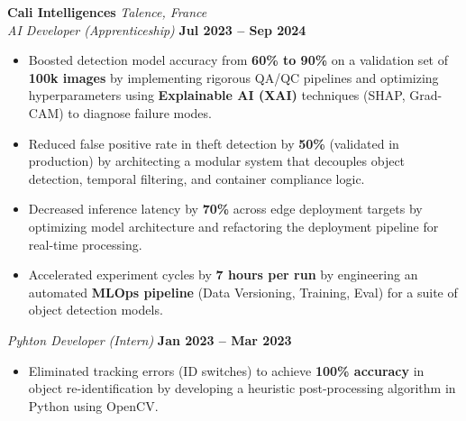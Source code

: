 \documentclass[10pt, letterpaper]{article}
\begin{document}
    \vspace{0.2cm}

    \textbf{Cali Intelligences} \hfill \textit{Talence, France} \\
    \textit{AI Developer (Apprenticeship)} \hfill \textbf{Jul 2023 -- Sep 2024}
    \begin{itemize}[topsep=0pt, itemsep=2pt, parsep=0pt, leftmargin=15pt]
        \item Boosted detection model accuracy from \textbf{60\% to 90\%} on a validation set of \textbf{100k images} by implementing rigorous QA/QC pipelines and optimizing hyperparameters using \textbf{Explainable AI (XAI)} techniques (SHAP, Grad-CAM) to diagnose failure modes.
        \item Reduced false positive rate in theft detection by \textbf{50\%} (validated in production) by architecting a modular system that decouples object detection, temporal filtering, and container compliance logic.
        \item Decreased inference latency by \textbf{70\%} across edge deployment targets by optimizing model architecture and refactoring the deployment pipeline for real-time processing.
        \item Accelerated experiment cycles by \textbf{7 hours per run} by engineering an automated \textbf{MLOps pipeline} (Data Versioning, Training, Eval) for a suite of object detection models.
    \end{itemize}
    \textit{Pyhton Developer (Intern)} \hfill \textbf{Jan 2023 -- Mar 2023}
    \begin{itemize}[topsep=0pt, itemsep=2pt, parsep=0pt, leftmargin=15pt]    
        \item Eliminated tracking errors (ID switches) to achieve \textbf{100\% accuracy} in object re-identification by developing a heuristic post-processing algorithm in Python using OpenCV.
    \end{itemize}

\end{document}
